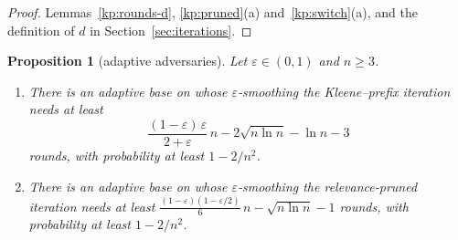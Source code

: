 \documentclass[11pt]{amsart}
\newtheorem{proposition}[theorem]{Proposition}
\theoremstyle{definition}
\theoremstyle{remark}
\newcommand{\eps}{\varepsilon}
\begin{document}
\begin{proof}
Lemmas~\ref{kp:rounds-d}, \ref{kp:pruned}(a) and~\ref{kp:switch}(a), and the definition of $d$
in Section~\ref{sec:iterations}.
\end{proof}

\begin{proposition}[adaptive adversaries]\label{prop:adaptive}
Let $\eps\in(0,1)$ and $n\ge3$.
\begin{enumerate}[label=(\alph*),leftmargin=2.4em]
\item There is an adaptive base on whose $\eps$-smoothing the Kleene--prefix iteration needs at
least
\[
\frac{(1-\eps)\,\eps}{2+\eps}\,n-2\sqrt{n\ln n}-\ln n-3
\]
rounds, with probability at least $1-2/n^2$.
\item There is an adaptive base on whose $\eps$-smoothing the relevance-pruned iteration needs at
least $\frac{(1-\eps)(1-\eps/2)}{6}\,n-\sqrt{n\ln n}-1$ rounds, with probability at least $1-2/n^2$.
\end{enumerate}
\end{proposition}
\end{document}
